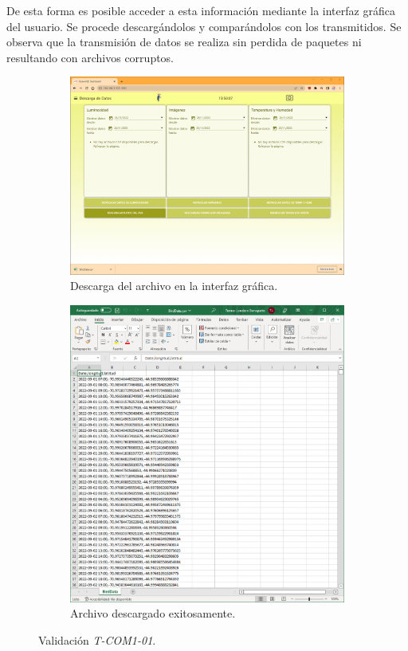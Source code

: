 De esta forma es posible acceder a esta información mediante la interfaz gráfica del usuario. Se procede descargándolos y comparándolos con los transmitidos. Se observa que la transmisión de datos se realiza sin perdida de paquetes ni resultando con archivos corruptos.
\begin{figure}[H]
	\centering
	\begin{subfigure}{0.49\textwidth}
		\centering
		\includegraphics[width=\linewidth]{ImagenesValidacion del prototipo/Descarga-1}		
		\caption{Descarga del archivo en la interfaz gráfica.}
	\end{subfigure}\hfill
	\begin{subfigure}{0.49\textwidth}
		\centering
		\includegraphics[width=\linewidth]{ImagenesValidacion del prototipo/Descarga-2}
		\caption{Archivo descargado exitosamente.}
	\end{subfigure}
	\caption{Validación \textit{T-COM1-01}.}
\end{figure}

